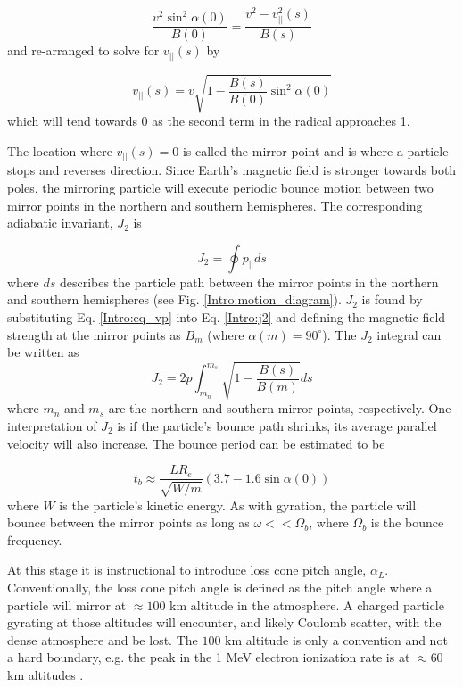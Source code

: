 \begin{equation}
\frac{v^2 \sin^2{\alpha(0)}}{B(0)} = \frac{v^2 - v^2_{||}(s)}{B(s)}
\end{equation} and re-arranged to solve for $v_{||}(s)$ by

\begin{equation} \label{Intro:eq_vp} 
v_{||}(s) = v \sqrt{1 - \frac{B(s)}{B(0)} \sin^2{\alpha(0)}}
\end{equation} which will tend towards 0 as the second term in the radical approaches 1.

The location where $v_{||}(s) = 0$ is called the mirror point and is where a particle stops and reverses direction. Since Earth's magnetic field is stronger towards both poles, the mirroring particle will execute periodic bounce motion between two mirror points in the northern and southern hemispheres. The corresponding adiabatic invariant, $J_2$ is

\begin{equation} \label{Intro:j2}
J_2 = \oint p_{||} ds
\end{equation} where $ds$ describes the particle path between the mirror points in the northern and southern hemispheres (see Fig. \ref{Intro:motion_diagram}). $J_2$ is found by substituting Eq. \ref{Intro:eq_vp} into Eq. \ref{Intro:j2} and defining the magnetic field strength at the mirror points as $B_m$ (where $\alpha(m) = 90^\circ$). The $J_2$ integral can be written as     
\begin{equation}
J_2 = 2 p \int_{m_n}^{m_s} \sqrt{1 - \frac{B(s)}{B(m)}} ds
\end{equation} where $m_n$ and $m_s$ are the northern and southern mirror points, respectively. One interpretation of $J_2$ is if the particle's bounce path shrinks, its average parallel velocity will also increase. The bounce period can be estimated \citep[e.g.][]{Baumjohann1997} to be 

\begin{equation}
t_b \approx \frac{L R_e}{\sqrt{W/m}} (3.7 - 1.6 \sin{\alpha(0)})
\end{equation} where $W$ is the particle's kinetic energy. As with gyration, the particle will bounce between the mirror points as long as $\omega << \Omega_b$, where $\Omega_b$ is the bounce frequency.

At this stage it is instructional to introduce loss cone pitch angle, $\alpha_L$.  Conventionally, the loss cone pitch angle is defined as the pitch angle where a particle will mirror at $\approx 100$ km altitude in the atmosphere. A charged particle gyrating at those altitudes will encounter, and likely Coulomb scatter, with the dense atmosphere and be lost. The $100$ km altitude is only a convention and not a hard boundary, e.g. the peak in the 1 MeV electron ionization rate is at $\approx 60$ km altitudes \citep{Fang2010}.

